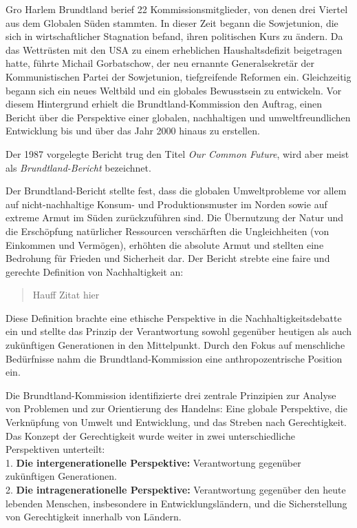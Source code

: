 \documentclass[
  letterpaper,
  DIV=11,
  numbers=noendperiod]{scrartcl}
\begin{document}
Gro Harlem Brundtland berief 22 Kommissionsmitglieder, von denen drei
Viertel aus dem Globalen Süden stammten. In dieser Zeit begann die
Sowjetunion, die sich in wirtschaftlicher Stagnation befand, ihren
politischen Kurs zu ändern. Da das Wettrüsten mit den USA zu einem
erheblichen Haushaltsdefizit beigetragen hatte, führte Michail
Gorbatschow, der neu ernannte Generalsekretär der Kommunistischen Partei
der Sowjetunion, tiefgreifende Reformen ein. Gleichzeitig begann sich
ein neues Weltbild und ein globales Bewusstsein zu entwickeln. Vor
diesem Hintergrund erhielt die Brundtland-Kommission den Auftrag, einen
Bericht über die Perspektive einer globalen, nachhaltigen und
umweltfreundlichen Entwicklung bis und über das Jahr 2000 hinaus zu
erstellen.

Der 1987 vorgelegte Bericht trug den Titel \emph{Our Common Future},
wird aber meist als \emph{Brundtland-Bericht} bezeichnet.

Der Brundtland-Bericht stellte fest, dass die globalen Umweltprobleme
vor allem auf nicht-nachhaltige Konsum- und Produktionsmuster im Norden
sowie auf extreme Armut im Süden zurückzuführen sind. Die Übernutzung
der Natur und die Erschöpfung natürlicher Ressourcen verschärften die
Ungleichheiten (von Einkommen und Vermögen), erhöhten die absolute Armut
und stellten eine Bedrohung für Frieden und Sicherheit dar. Der Bericht
strebte eine faire und gerechte Definition von Nachhaltigkeit an:

\begin{quote}
Hauff Zitat hier
\end{quote}

Diese Definition brachte eine ethische Perspektive in die
Nachhaltigkeitsdebatte ein und stellte das Prinzip der Verantwortung
sowohl gegenüber heutigen als auch zukünftigen Generationen in den
Mittelpunkt. Durch den Fokus auf menschliche Bedürfnisse nahm die
Brundtland-Kommission eine anthropozentrische Position ein.

Die Brundtland-Kommission identifizierte drei zentrale Prinzipien zur
Analyse von Problemen und zur Orientierung des Handelns: Eine globale
Perspektive, die Verknüpfung von Umwelt und Entwicklung, und das Streben
nach Gerechtigkeit. Das Konzept der Gerechtigkeit wurde weiter in zwei
unterschiedliche Perspektiven unterteilt:\\
1. \textbf{Die intergenerationelle Perspektive:} Verantwortung gegenüber
zukünftigen Generationen.\\
2. \textbf{Die intragenerationelle Perspektive:} Verantwortung gegenüber
den heute lebenden Menschen, insbesondere in Entwicklungsländern, und
die Sicherstellung von Gerechtigkeit innerhalb von Ländern.
\end{document}
